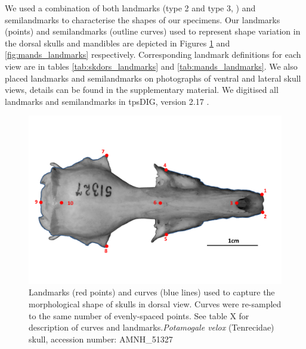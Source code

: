 \documentclass[12pt,a4paper]{article}
\begin{document}
We used a combination of both landmarks (type 2 and type 3, \citep{Zelditch2012}) and semilandmarks to characterise the shapes of our specimens. Our landmarks (points) and semilandmarks (outline curves) used to represent shape variation in the dorsal skulls and mandibles are depicted in Figures \ref{fig:skdors_landmarks} and \ref{fig:mands_landmarks} respectively. Corresponding landmark definitions for each view are in tables \ref{tab:skdors_landmarks} and \ref{tab:mands_landmarks}. We also placed landmarks and semilandmarks on photographs of ventral and lateral skull views, details can be found in the supplementary material. We digitised all landmarks and semilandmarks in tpsDIG, version 2.17 \citep{Rohlf2013}.

\begin{figure}
\centering
\includegraphics[width=1\linewidth]{figures/AMNH_51327_dorsallandmarksdiagram.png}
\caption{Landmarks (red points) and curves (blue lines) used to capture the morphological shape of skulls in dorsal view. Curves were re-sampled to the same number of evenly-spaced points. See table X for description of curves and landmarks.\textit{Potamogale velox} (Tenrecidae) skull, accession number: AMNH\_51327}
\label{fig:skdors_landmarks}
\end{figure}
\end{document}
